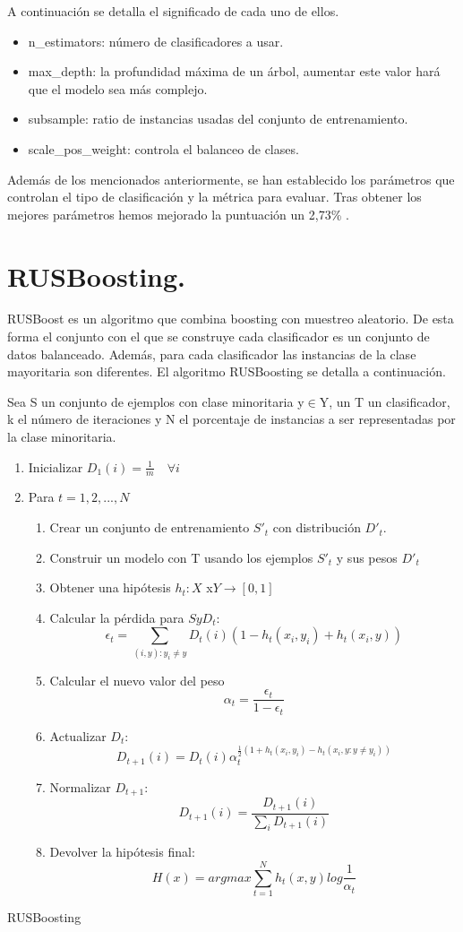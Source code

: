 A continuación se detalla el significado de cada uno de ellos.
\begin{itemize}
	\item n\_estimators: número de clasificadores a usar.
	\item max\_depth: la profundidad máxima de un árbol, aumentar este valor hará
	que el modelo sea más complejo.
	\item subsample: ratio de instancias usadas del conjunto de entrenamiento.
	\item  scale\_pos\_weight: controla el balanceo de clases.
\end{itemize}

Además de los mencionados anteriormente, se han establecido los parámetros que
controlan el tipo de clasificación y la métrica para evaluar.
Tras obtener los mejores parámetros hemos mejorado la puntuación un 2,73\% .
 \newpage
\section{RUSBoosting.}
RUSBoost es un algoritmo que combina boosting con muestreo aleatorio. De esta forma el conjunto con el que se construye cada clasificador es un conjunto de datos balanceado. Además, para cada clasificador las instancias de la clase mayoritaria son diferentes. El algoritmo RUSBoosting se detalla a continuación.
\begin{algorithm}[H]
	
	Sea S un conjunto de ejemplos con clase minoritaria y$\in$Y, un T un
	clasificador, k el número de iteraciones y N el porcentaje de instancias a ser
	representadas por la clase minoritaria.
	\begin{enumerate}
		\item Inicializar $D_1(i) = \frac{1}{m}\quad \forall i$
		\item Para $t=1,2,...,N$
		\begin{enumerate}
			\item Crear un conjunto de entrenamiento $S'_t$ con distribución $D'_t$.
			\item Construir un modelo con T usando los ejemplos $S'_t$ y sus pesos $D'_t$
			
			\item Obtener una hipótesis $h_t : X$ x$ Y \to [0,1]$
			\item Calcular la pérdida para $S y D_t$:
			$$
			\epsilon_t = \sum_{(i,y):y_i\neq y} D_t(i)(1-h_t(x_i,y_i)+h_t(x_i,y))
			$$
			\item Calcular el nuevo valor del peso
			$$\alpha_t = \frac{\epsilon_t}{1-\epsilon_t}$$
			\item Actualizar $D_t$:
			$$
			D_{t+1} (i) = D_t(i) \alpha_t^{\frac{1}{2}(1+h_t(x_i,y_i)-h_t(x_i,y:y\neq
				y_i))}
			$$		
			\item Normalizar $D_{t+1}$:
			$$
			D_{t+1}(i) = \frac{D_{t+1}(i)}{\sum_{i}D_{t+1}(i)}
			$$
			\item Devolver la hipótesis final:
			$$
			H(x) = argmax \sum_{t=1}^{N}h_t(x,y)log\frac{1}{\alpha_t}
			$$
		\end{enumerate}
	\end{enumerate} 
	\caption{RUSBoosting}
\end{algorithm}


